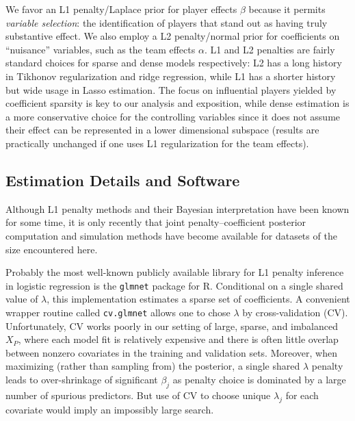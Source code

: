 We favor an L1 penalty/Laplace prior for player effects $\beta$
because it permits {\it variable selection}: the identification of
players that stand out as having truly substantive effect.
We also employ a L2 penalty/normal prior for coefficients on
``nuisance'' variables, such as the team effects $\alpha$.  L1
and L2 penalties are fairly standard choices for sparse and dense
models respectively: L2 has a long history in Tikhonov regularization
and ridge regression, while L1 has a shorter history but wide usage in
Lasso estimation.  The focus on influential players yielded by
coefficient sparsity is key to our analysis and exposition, while
dense estimation is a more conservative choice for the controlling
variables since it does not assume their effect can be represented in
a lower dimensional subspace (results are practically unchanged if one
uses L1 regularization for the team effects).

\subsection{Estimation Details and Software}\label{sec:methods}

Although L1 penalty methods and their Bayesian interpretation have
been known for some time, it is only recently that joint
penalty--coefficient posterior computation and simulation methods have
become available for datasets of the size encountered here.  

Probably the most well-known publicly available library for L1 penalty
inference in logistic regression is the {\tt glmnet} package
\cite{fried:hast:tibsh:2009} for {\sf R}.  Conditional on a single
shared value of $\lambda$, this implementation estimates a sparse set
of coefficients.  A convenient wrapper routine called {\tt cv.glmnet}
allows one to chose $\lambda$ by cross-validation (CV).
Unfortunately, CV works poorly in our setting of large, sparse, and
imbalanced $X_P$, where each model fit is relatively expensive and
there is often little overlap between nonzero covariates in the
training and validation sets.  Moreover, when maximizing (rather than
sampling from) the posterior, a single shared $\lambda$ penalty 
leads to over-shrinkage of significant $\beta_j$ as  penalty
choice is dominated by a large number of spurious predictors.  But use
of CV to choose unique $\lambda_j$ for each covariate would imply an
impossibly large search.


